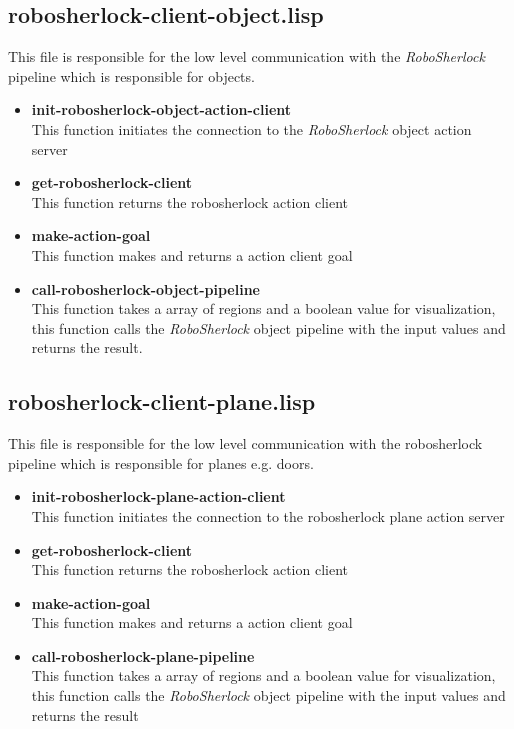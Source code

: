 \documentclass[main.tex]{subfiles}
\begin{document}
		\subsection{robosherlock-client-object.lisp}
		\label{object-perceive}
		This file is responsible for the low level communication with the \textit{RoboSherlock} pipeline which is responsible for objects.
		\begin{itemize}
			\item \textbf{init-robosherlock-object-action-client} \\
			This function initiates the connection to the \textit{RoboSherlock} object action server
			\item \textbf{get-robosherlock-client} \\
			This function returns the robosherlock action client
			\item \textbf{make-action-goal} \\
			This function makes and returns a action client goal
			\item \textbf{call-robosherlock-object-pipeline} \\
			This function takes a array of regions and a boolean value for visualization, this function calls the \textit{RoboSherlock} object pipeline with the input values and returns the result.
		\end{itemize}
		\subsection{robosherlock-client-plane.lisp}
		This file is responsible for the low level communication with the robosherlock pipeline which is responsible for planes e.g. doors.
		\begin{itemize}
			\item \textbf{init-robosherlock-plane-action-client} \\
			This function initiates the connection to the robosherlock plane action server
			\item \textbf{get-robosherlock-client} \\
			This function returns the robosherlock action client
			\item \textbf{make-action-goal} \\
			This function makes and returns a action client goal
			\item \textbf{call-robosherlock-plane-pipeline} \\
			This function takes a array of regions and a boolean value for visualization, this function calls the \textit{RoboSherlock} object pipeline with the input values and returns the result
		\end{itemize}
	\endgroup
\end{document}
